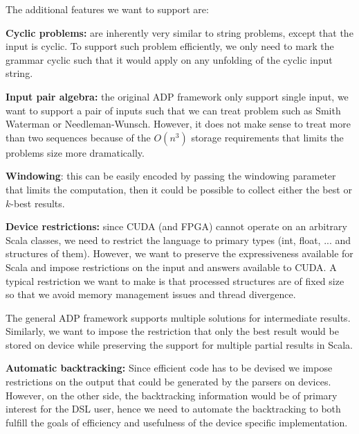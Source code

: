 The additional features we want to support are:\ol
\item \textbf{Cyclic problems:} are inherently very similar to string problems, except that the input is cyclic. To support such problem efficiently, we only need to mark the grammar cyclic such that it would apply on any unfolding of the cyclic input string.
\item \textbf{Input pair algebra:} the original ADP framework only support single input, we want to support a pair of inputs such that we can treat problem such as Smith Waterman or Needleman-Wunsch. However, it does not make sense to treat more than two sequences because of the $O(n^3)$ storage requirements that limits the problems size more dramatically.
\item \textbf{Windowing}: this can be easily encoded by passing the windowing parameter that limits the computation, then it could be possible to collect either the best or $k$-best results.
\item \textbf{Device restrictions:} since CUDA (and FPGA) cannot operate on an arbitrary Scala classes, we need to restrict the language to primary types (int, float, ... and structures of them). However, we want to preserve the expressiveness available for Scala and impose restrictions on the input and answers available to CUDA. A typical restriction we want to make is that processed structures are of fixed size so that we avoid memory management issues and thread divergence.

The general ADP framework supports multiple solutions for intermediate results. Similarly, we want to impose the restriction that only the best result would be stored on device while preserving the support for multiple partial results in Scala.

\item \textbf{Automatic backtracking:} Since efficient code has to be devised we impose restrictions on the output that could be generated by the parsers on devices. However, on the other side, the backtracking information would be of primary interest for the DSL user, hence we need to automate the backtracking to both fulfill the goals of efficiency and usefulness of the device specific implementation.

